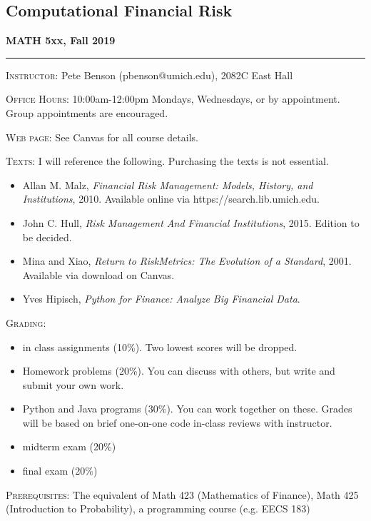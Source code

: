 \documentclass[11pt]{article}
\begin{document}
\begin{center}
\section*{Computational Financial Risk}
{\bf MATH 5xx, Fall 2019}
\end{center}

\vspace{3mm}
\hrule
\vspace{3mm}

\textsc{Instructor:} Pete Benson (pbenson@umich.edu),  2082C East Hall

\textsc{Office Hours:} 10:00am-12:00pm Mondays, Wednesdays, or by appointment. Group appointments are encouraged.

\textsc{Web page:}  See Canvas for all course details.

\textsc{Texts:}  I will reference the following. Purchasing the texts is not essential. 
\begin{itemize}
	\item Allan M. Malz, {\it Financial Risk Management: Models, History, and Institutions}, 2010. Available online via https://search.lib.umich.edu.
	\item John C. Hull, {\it Risk Management And Financial Institutions}, 2015. Edition to be decided. 
	\item Mina and Xiao, {\it Return to RiskMetrics: The Evolution of a Standard}, 2001. Available via download on Canvas.
	\item Yves Hipisch, {\it Python for Finance: Analyze Big Financial Data}.
\end{itemize}

\textsc{Grading:}  
\begin{itemize}
	\item in class assignments (10\%). Two lowest scores will be dropped. 
	\item Homework problems (20\%). You can discuss with others, but write and submit your own work. 
	\item Python and Java programs (30\%). You can work together on these. Grades will be based on brief one-on-one code in-class reviews with instructor. 
	\item midterm exam (20\%)
	\item final exam (20\%)
\end{itemize}


\textsc{Prerequisites:}
The equivalent of Math 423 (Mathematics of Finance), Math 425 (Introduction to Probability), a programming course (e.g. EECS 183)
\end{document}
